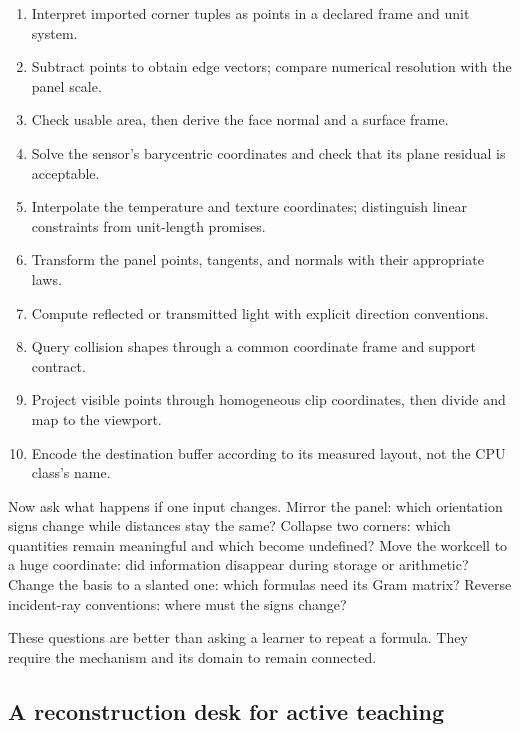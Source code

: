 \begin{enumerate}
\def\labelenumi{\arabic{enumi}.}
\tightlist
\item
  Interpret imported corner tuples as points in a declared frame and unit system.
\item
  Subtract points to obtain edge vectors; compare numerical resolution with the panel scale.
\item
  Check usable area, then derive the face normal and a surface frame.
\item
  Solve the sensor's barycentric coordinates and check that its plane residual is acceptable.
\item
  Interpolate the temperature and texture coordinates; distinguish linear constraints from unit-length promises.
\item
  Transform the panel points, tangents, and normals with their appropriate laws.
\item
  Compute reflected or transmitted light with explicit direction conventions.
\item
  Query collision shapes through a common coordinate frame and support contract.
\item
  Project visible points through homogeneous clip coordinates, then divide and map to the viewport.
\item
  Encode the destination buffer according to its measured layout, not the CPU class's name.
\end{enumerate}

Now ask what happens if one input changes. Mirror the panel: which orientation signs change while distances stay the same? Collapse two corners: which quantities remain meaningful and which become undefined? Move the workcell to a huge coordinate: did information disappear during storage or arithmetic? Change the basis to a slanted one: which formulas need its Gram matrix? Reverse incident-ray conventions: where must the signs change?

These questions are better than asking a learner to repeat a formula. They require the mechanism and its domain to remain connected.

\subsection{A reconstruction desk for active teaching}\label{02-foundations-ii-ch038-a-reconstruction-desk-for-active-teaching}

\hypertarget{02-foundations-ii-ch038-a-reconstruction-desk-for-active-teaching}{}

